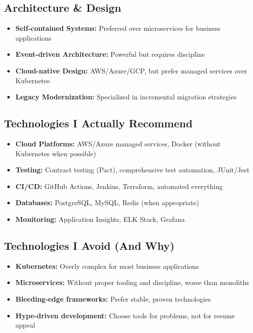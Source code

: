 \documentclass[11pt,a4paper]{article}
\begin{document}
\subsection{Architecture \& Design}
\begin{itemize}
\item \textbf{Self-contained Systems:} Preferred over microservices for business applications
\item \textbf{Event-driven Architecture:} Powerful but requires discipline
\item \textbf{Cloud-native Design:} AWS/Azure/GCP, but prefer managed services over Kubernetes
\item \textbf{Legacy Modernization:} Specialized in incremental migration strategies
\end{itemize}

\subsection{Technologies I Actually Recommend}
\begin{itemize}
\item \textbf{Cloud Platforms:} AWS/Azure managed services, Docker (without Kubernetes when possible)
\item \textbf{Testing:} Contract testing (Pact), comprehensive test automation, JUnit/Jest
\item \textbf{CI/CD:} GitHub Actions, Jenkins, Terraform, automated everything
\item \textbf{Databases:} PostgreSQL, MySQL, Redis (when appropriate)
\item \textbf{Monitoring:} Application Insights, ELK Stack, Grafana
\end{itemize}

\subsection{Technologies I Avoid (And Why)}
\begin{itemize}
\item \textbf{Kubernetes:} Overly complex for most business applications
\item \textbf{Microservices:} Without proper tooling and discipline, worse than monoliths
\item \textbf{Bleeding-edge frameworks:} Prefer stable, proven technologies
\item \textbf{Hype-driven development:} Choose tools for problems, not for resume appeal
\end{itemize}
\end{document}
